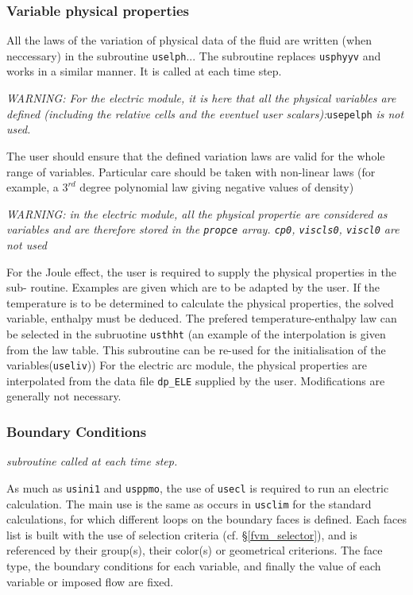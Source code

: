 {{{%
\subsubsection{Variable physical properties}

All the laws of the variation of physical data of the fluid are written (when neccessary)
in the subroutine \texttt{uselph}... The subroutine replaces \texttt{usphyyv} and works
 in a similar manner. It is called at each time step.

{\em WARNING: For the electric module, it is here that all the physical variables are defined
 (including the relative cells and the eventuel user scalars):}\texttt{usepelph} {\em {is not used.}}

The user should ensure that the defined variation laws are valid for the whole range of
variables. Particular care should be taken with non-linear laws (for example, a
 $3^{rd}$ degree polynomial law giving negative values of density)

{\em WARNING: in the electric module, all the physical propertie are considered as variables
 and are therefore stored in the \texttt{propce} array. \texttt{cp0}, \texttt{viscls0}, \texttt{viscl0}
 are not used}

For the Joule effect, the user is required to supply the physical properties in the sub-
routine. Examples are given which are to be adapted by the user. If the temperature is
to be determined to calculate the physical properties, the solved variable, enthalpy must
 be deduced. The prefered temperature-enthalpy law can be selected in the subruotine
 \texttt{usthht} (an example of the interpolation is given from the law table. This
subroutine can be re-used for the initialisation of the variables(\texttt{useliv}))
 For the electric arc module, the physical properties are interpolated from the data file
 \texttt{dp\_ELE} supplied by the user. Modifications are generally not necessary.

\subsubsection{Boundary Conditions}

\noindent
\textit {subroutine called at each time step.}

As much as \texttt{usini1} and \texttt{usppmo}, the use of \texttt{usecl}
is required to run an electric calculation. The main use is the same as
occurs in \texttt{usclim} for the standard \CS calculations, for which 
different loops on the boundary faces is defined. Each faces list is
built with the use of selection criteria (cf. \S\ref{fvm_selector}),
and is referenced by their group(s), their color(s) or geometrical
criterions. The face type, the boundary conditions for each variable,
and finally the value of each variable or imposed flow are fixed.

}}}
